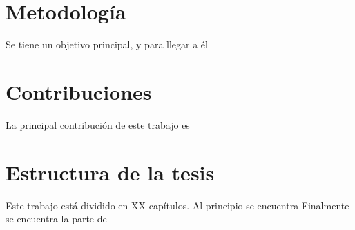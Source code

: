 \section{Metodología}

Se tiene un objetivo principal, y para llegar a \'el %
\blindtext

\section{Contribuciones}

La principal contribución de este trabajo es 
\blindtext

\section{Estructura de la tesis}

Este trabajo está dividido en XX capítulos. Al principio se encuentra 
Finalmente se encuentra la parte de 